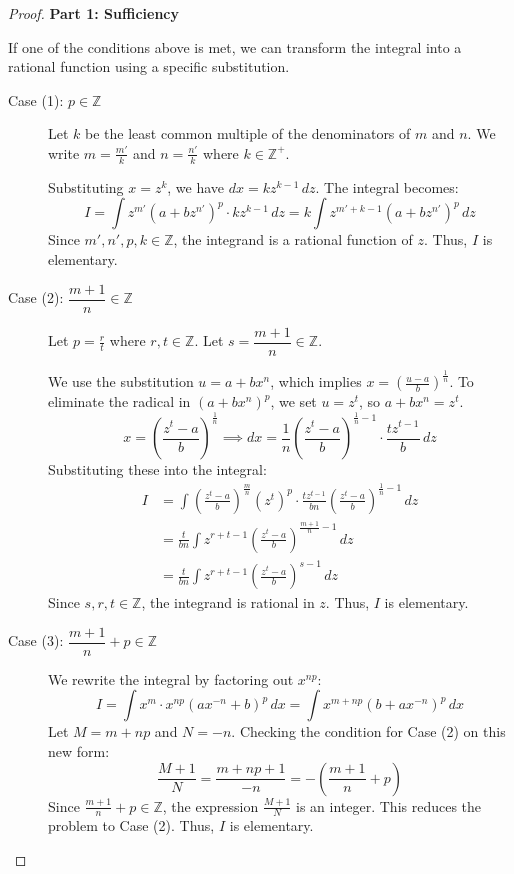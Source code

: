 \begin{proof}
\textbf{Part 1: Sufficiency}

If one of the conditions above is met, we can transform the integral into a rational function using a specific substitution.

\begin{description}
    \item[Case (1): $p \in \mathbb{Z}$] 
    Let $k$ be the least common multiple of the denominators of $m$ and $n$. We write $m = \frac{m'}{k}$ and $n = \frac{n'}{k}$ where $k \in \mathbb{Z}^+$.
    
    Substituting $x = z^k$, we have $dx = k z^{k-1} \, dz$. The integral becomes:
    \[ 
    I = \int z^{m'} (a + b z^{n'})^p \cdot k z^{k-1} \, dz = k \int z^{m' + k - 1} (a + b z^{n'})^p \, dz 
    \]
    Since $m', n', p, k \in \mathbb{Z}$, the integrand is a rational function of $z$. Thus, $I$ is elementary.

    \item[Case (2): $\dfrac{m+1}{n} \in \mathbb{Z}$]
    Let $p = \frac{r}{t}$ where $r, t \in \mathbb{Z}$. Let $s = \dfrac{m+1}{n} \in \mathbb{Z}$.
    
    We use the substitution $u = a + bx^n$, which implies $x = \left(\frac{u-a}{b}\right)^{\frac{1}{n}}$. To eliminate the radical in $(a+bx^n)^p$, we set $u = z^t$, so $a + bx^n = z^t$.
    \[
    x = \left(\frac{z^t - a}{b}\right)^{\frac{1}{n}} \implies dx = \frac{1}{n} \left(\frac{z^t - a}{b}\right)^{\frac{1}{n} - 1} \cdot \frac{t z^{t-1}}{b} \, dz
    \]
    Substituting these into the integral:
    \[
    \begin{aligned}
    I &= \int \left(\frac{z^t - a}{b}\right)^{\frac{m}{n}} (z^t)^p \cdot \frac{t z^{t-1}}{bn} \left(\frac{z^t - a}{b}\right)^{\frac{1}{n} - 1} \, dz \\
      &= \frac{t}{bn} \int z^{r + t - 1} \left(\frac{z^t - a}{b}\right)^{\frac{m+1}{n} - 1} \, dz \\
      &= \frac{t}{bn} \int z^{r + t - 1} \left(\frac{z^t - a}{b}\right)^{s - 1} \, dz
    \end{aligned}
    \]
    Since $s, r, t \in \mathbb{Z}$, the integrand is rational in $z$. Thus, $I$ is elementary.

    \item[Case (3): $\dfrac{m+1}{n} + p \in \mathbb{Z}$]
    We rewrite the integral by factoring out $x^{np}$:
    \[ 
    I = \int x^m \cdot x^{np} (a x^{-n} + b)^p \, dx = \int x^{m+np} (b + a x^{-n})^p \, dx 
    \]
    Let $M = m+np$ and $N = -n$. Checking the condition for Case (2) on this new form:
    \[
    \frac{M+1}{N} = \frac{m+np+1}{-n} = -\left(\frac{m+1}{n} + p\right)
    \]
    Since $\frac{m+1}{n} + p \in \mathbb{Z}$, the expression $\frac{M+1}{N}$ is an integer. This reduces the problem to Case (2). Thus, $I$ is elementary.
\end{description}


\end{proof}
